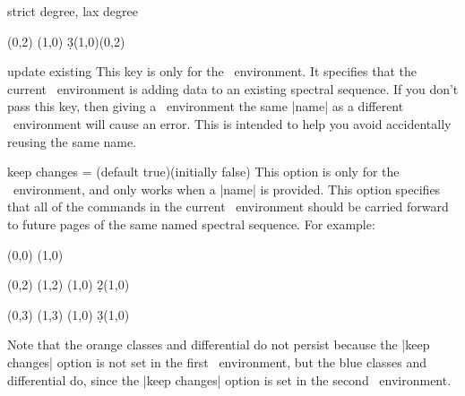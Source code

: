 \begin{sseqdata}[name = basic, cohomological Serre grading]
\begin{keylist}{strict degree, lax degree}
\begin{codeexample}[]
\begin{sseqdata}[ name = laxdegree, Adams grading, lax degree, yscale = 0.6 ]
\class(0,2)
\class(1,0)
\d3(1,0)(0,2) %
\end{sseqdata}
\printpage[ name = laxdegree, page = 3 ]
\end{codeexample}
\end{keylist}

\begin{key}{update existing}
This key is only for the \sseqdataenv\  environment. It specifies that the
current \sseqdataenv\  environment is adding data to an existing spectral
sequence. If you don't pass this key, then giving a \sseqdataenv\  environment
the same |name| as a different \sseqdataenv\  environment will cause an error.
This is intended to help you avoid accidentally reusing the same name.
\end{key}


\begin{key}{keep changes = (default true)(initially false)}%
This option is only for the \sseqpageenv\  environment, and only works when a
|name| is provided. This option specifies that all of the commands in the
current \sseqpageenv\  environment should be carried forward to future pages of
the same named spectral sequence. For example:
\begin{codeexample}[]
\begin{sseqdata}[ name = keep changes example, Adams grading, y range = {0}{3} ]
\class(0,0)
\class(1,0)
\end{sseqdata}

\begin{sseqpage}[ name = keep changes example, sseq = orange ]
\class(0,2)
\class(1,2)
\classoptions[orange](1,0)
\d2(1,0)
\end{sseqpage} \qquad

\printpage[ name = keep changes example, page = 2 ] \qquad

\begin{sseqpage}[ name = keep changes example, sseq = blue, keep changes ]
\class(0,3)
\class(1,3)
\classoptions[blue](1,0)
\d3(1,0)
\end{sseqpage} \qquad

\printpage[ name = keep changes example, page = 3 ]
\end{codeexample}
Note that the orange classes and differential do not persist because the
|keep changes| option is not set in the first \sseqpageenv\  environment, but the blue
classes and differential do, since the |keep changes| option is set in the
second \sseqpageenv\  environment.
\end{key}



\end{sseqdata}
